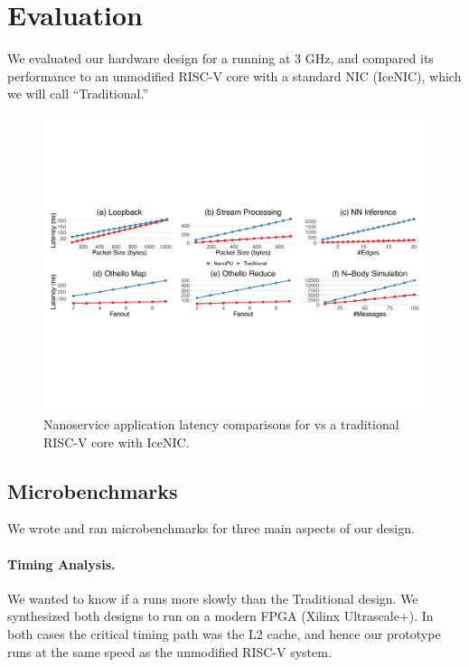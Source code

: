 \section{Evaluation}
\label{sec:evaluation}
We evaluated our hardware design for a \name{} running at 3 GHz, and compared its performance to an unmodified RISC-V core with a standard NIC (IceNIC), which we will call ``Traditional.'' 

\begin{figure}
  \includegraphics[width=\linewidth]{./figures/latency}
  \caption{Nanoservice application latency comparisons for \name{} vs a traditional RISC-V core with IceNIC.}
  \label{fig:latency}
\end{figure}

\subsection{Microbenchmarks}
We wrote and ran microbenchmarks for three main aspects of our \name{} design. 

\paragraph{Timing Analysis.} We wanted to know if a \name{} runs more slowly than the Traditional design. We synthesized both designs to run on a modern FPGA (Xilinx Ultrascale+). In both cases the critical timing path was the L2 cache, and hence our \name{} prototype runs at the same speed as the unmodified RISC-V system.


